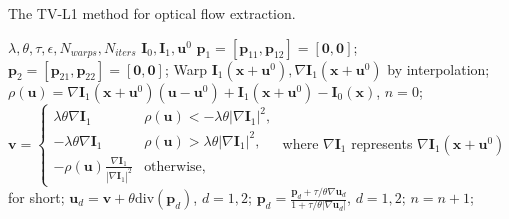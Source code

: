 \documentclass[10pt,twocolumn,letterpaper]{article}
\def\Vec#1{{\boldsymbol{#1}}}
\def\Mat#1{{\boldsymbol{#1}}}
\begin{document}
\begin{algorithm}[t]
\caption{The TV-L1 method for optical flow extraction.}
\label{Alg:tvl1}
\begin{algorithmic}
    $\lambda,\theta,\tau,\epsilon,N_{warps},N_{iters}$
    $\Mat{I}_0,\Mat{I}_1,\Vec{u}^0$
   \STATE $\Vec{p}_1=[\Vec{p}_{11},\Vec{p}_{12}]=[\Vec{0},\Vec{0}]$;
   \STATE $\Vec{p}_2=[\Vec{p}_{21},\Vec{p}_{22}]=[\Vec{0},\Vec{0}]$;
   \STATE Warp $\Mat{I}_1(\Vec{x}+\Vec{u}^0), \nabla\Mat{I}_1(\Vec{x}+\Vec{u}^0)$ by interpolation;
   \STATE $\rho(\Vec{u})=\nabla\Mat{I}_1(\Vec{x}+\Vec{u}^{0})(\Vec{u}-\Vec{u}^{0})+\Mat{I}_1(\Vec{x}+\Vec{u}^0)-\Mat{I}_0(\Vec{x})$, $n=0$;
   \STATE $\Vec{v}= \left\{
   \begin{array}{ll}
   \lambda\theta\nabla\Mat{I}_1 & \rho(\Vec{u})<-\lambda\theta|\nabla\Mat{I}_1|^2,\\
   -\lambda\theta\nabla\Mat{I}_1 & \rho(\Vec{u})>\lambda\theta|\nabla\Mat{I}_1|^2,\\
   -\rho(\Vec{u})\frac{\nabla\Mat{I}_1}{|\nabla\Mat{I}_1|^2} & \text{otherwise},
   \end{array}
   \right. $ where $\nabla\Mat{I}_1$ represents $\nabla\Mat{I}_1(\Vec{x}+\Vec{u}^0)$ for short;
   \STATE $\Vec{u}_d=\Vec{v}+\theta \mathrm{div}(\Vec{p}_d)$, $d=1,2$;
   \STATE $\Vec{p}_d=\frac{\Vec{p}_d+\tau/\theta \nabla\Vec{u}_d}{1+\tau/\theta|\nabla\Vec{u}_d|}$, $d=1,2$;
   \STATE $n=n+1$;
   \ENDWHILE
   \ENDFOR
\vskip -0.1in
\end{algorithmic}
\end{algorithm}
\end{document}
